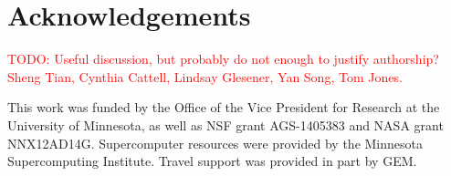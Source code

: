 \documentclass{article}
\newcommand{\todo}[1]{ \textcolor{red}{TODO: #1} }
\begin{document}
\section{Acknowledgements}

\todo{Useful discussion, but probably do not enough to justify authorship? Sheng Tian, Cynthia Cattell, Lindsay Glesener, Yan Song, Tom Jones. }

This work was funded by the Office of the Vice President for Research at the University of Minnesota, as well as NSF grant AGS-1405383 and NASA grant NNX12AD14G. Supercomputer resources were provided by the Minnesota Supercomputing Institute. Travel support was provided in part by GEM.


\end{document}
